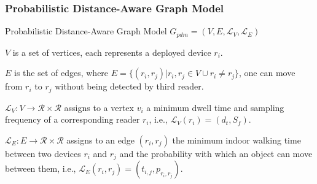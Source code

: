 
\begin{frame}
\frametitle{Probabilistic Distance-Aware Graph Model}

\begin{block}{Probabilistic Distance-Aware Graph Model}
  $G_{pdm} = (V, E, \mathcal{L}_V, \mathcal{L}_E)$
  \begin{fitemize}
    \item $V$ is a set of vertices, each represents a deployed device $r_i$.
    \item $E$ is the set of edges, where $E = \{ (r_i, r_j) | r_i, r _j \in V \cup r_i \neq r_j \}$, one can move from $r_i$ to $r_j$ without being detected by third reader.
    \item $\mathcal{L}_V: V \rightarrow \mathcal{R} \times \mathcal{R}$ assigns to a vertex $v_i$ a minimum dwell time and sampling frequency of a corresponding reader $r_i$, i.e., $\mathcal{L}_V(r_i) = (d_t, S_f)$.
    \item $\mathcal{L}_E: E \rightarrow \mathcal{R} \times \mathcal{R}$ assigns to an edge $(r_i, r_j)$ the minimum indoor walking time between two devices $r_i$ and $r_j$ and the probability with which an object can move between them, i.e., $\mathcal{L}_E(r_i, r_j) = (t_{i,j}, p_{r_i,r_j})$.
  \end{fitemize}
\end{block}

\end{frame}


